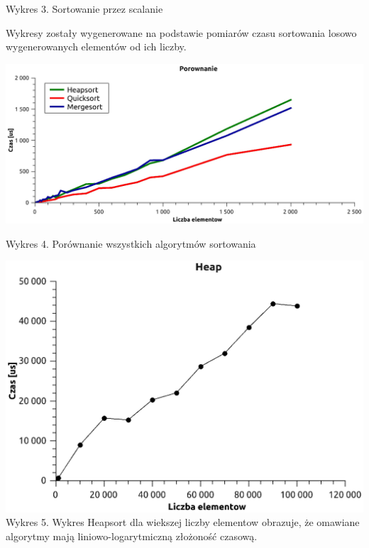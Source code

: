 \documentclass[12pt,a4paper]{article}
\begin{document}
Wykres 3. Sortowanie przez scalanie \newpage

Wykresy zostały wygenerowane na podstawie pomiarów czasu sortowania losowo wygenerowanych elementów od ich liczby.    \newline

\includegraphics[scale=0.6]{./wszystkie}

Wykres 4. Porównanie wszystkich algorytmów sortowania \newline

\includegraphics[scale=0.8]{./wiecejelem} \newline
Wykres 5. Wykres Heapsort dla wiekszej liczby elementow obrazuje,\newline 
że omawiane algorytmy mają liniowo-logarytmiczną złożoność czasową.  \newline
\end{document}
